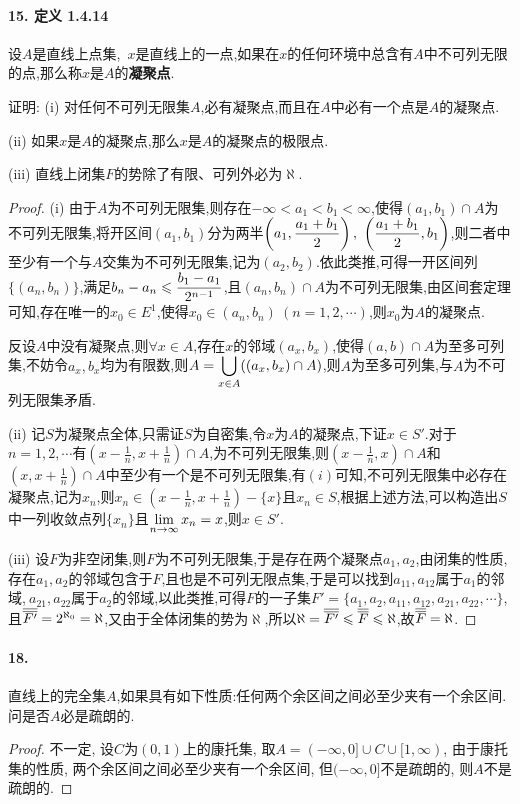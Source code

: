 \documentclass[12pt, a4paper, oneside]{ctexart}
\begin{document}
\paragraph{15. 定义 1.4.14}设$A$是直线上点集,\ $x$是直线上的一点,如果在$x$的任何环境中总含有$A$中不可列无限的点,那么称$x$是$A$的\textbf{凝聚点}.

证明: (i) 对任何不可列无限集$A$,必有凝聚点,而且在$A$中必有一个点是$A$的凝聚点.

(ii) 如果$x$是$A$的凝聚点,那么$x$是$A$的凝聚点的极限点.

(iii) 直线上闭集$F$的势除了有限、可列外必为$\aleph$.
\begin{proof}
    (i) 由于$A$为不可列无限集,则存在$-\infty < a_1 < b_1 < \infty$,使得$(a_1,b_1)\cap A$为不可列无限集,将开区间$(a_1,b_1)$分为两半$\disp \left(a_1,\frac{a_1+b_1}{2}\right),\ \left(\frac{a_1+b_1}{2},b_1\right)$,则二者中至少有一个与$A$交集为不可列无限集,记为$(a_2,b_2)$.依此类推,可得一开区间列$\{(a_n,b_n)\}$,满足$\displaystyle b_n-a_n\leqslant \frac{b_1-a_1}{2^{n-1}}$,且$(a_n,b_n)\cap A$为不可列无限集,由区间套定理可知,存在唯一的$x_0\in E^1$,使得$x_0\in (a_n,b_n)\ (n=1,2,\cdots)$,则$x_0$为$A$的凝聚点.

    反设$A$中没有凝聚点,则$\forall x \in A$,存在$x$的邻域$(a_x,b_x)$,使得$(a,b)\cap A$为至多可列集,不妨令$a_x,b_x$均为有限数,则$\displaystyle A=\bigcup_{x\in A}((a_x,b_x)\cap A)$,则$A$为至多可列集,与$A$为不可列无限集矛盾.
    
    (ii) 记$S$为凝聚点全体,只需证$S$为自密集,令$x$为$A$的凝聚点,下证$x \in S'$.对于$n = 1,2,\cdots$有$ \left(x-\frac{1}{n},x+\frac{1}{n}\right)\cap A$,为不可列无限集,则$(x-\frac{1}{n}, x)\cap A$和$(x, x+\frac{1}{n})\cap A$中至少有一个是不可列无限集,有$(i)$可知,不可列无限集中必存在凝聚点,记为$x_n$,则$x_n\in(x-\frac{1}{n},x+\frac{1}{n})-\{x\}$且$x_n\in S$,根据上述方法,可以构造出$S$中一列收敛点列$\{x_n\}$且$\displaystyle\lim_{n\rightarrow \infty}x_n=x$,则$x\in S'$.

    (iii) 设$F$为非空闭集,则$F$为不可列无限集,于是存在两个凝聚点$a_1,a_2$,由闭集的性质,存在$a_1,a_2$的邻域包含于$F$,且也是不可列无限点集,于是可以找到$a_{11},a_{12}$属于$a_{1}$的邻域,$\ a_{21}, a_{22}$属于$a_{2}$的邻域,以此类推,可得$F$的一子集$F' = \{a_1, a_2, a_{11},a_{12}, a_{21}, a_{22},\cdots\}$,且$\overline{\overline{F'}} = 2^{\aleph_0} = \aleph$,又由于全体闭集的势为$\aleph$,所以$\aleph = \overline{\overline{F'}}\leqslant \overline{\overline{F}} \leqslant \aleph$,故$\overline{\overline{F}} = \aleph$.

\end{proof}

\paragraph{18.}直线上的完全集$A$,如果具有如下性质:任何两个余区间之间必至少夹有一个余区间.问是否$A$必是疏朗的.
\begin{proof}
    不一定, 设$C$为$(0,1)$上的康托集, 取$A = (-\infty, 0]\cup C\cup [1,\infty)$, 由于康托集的性质, 两个余区间之间必至少夹有一个余区间, 但$(-\infty,0]$不是疏朗的, 则$A$不是疏朗的.
\end{proof}
\end{document}
